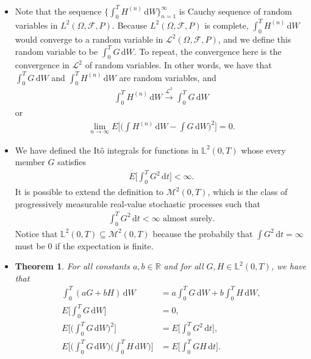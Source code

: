 \documentclass[10pt]{article}
\newtheorem{theorem}[lemma]{Theorem}
\newcommand{\dee}{\mathrm{d}}
\newcommand{\mcal}[1]{\mathcal{#1}}
\newcommand{\Real}{\mathbb{R}}
\begin{document}
\begin{itemize}
  \item Note that the sequence $\Big\{ \int_0^T H^{(n)}\, \dee W \Big\}_{n=1}^\infty$ is Cauchy sequence of random variables in $L^2(\Omega, \mcal{F}, P)$. Because $L^2(\Omega, \mcal{F}, P)$ is complete, $\int_0^T H^{(n)}\, \dee W$  would converge to a random variable in $\mcal{L}^2(\Omega, \mcal{F}, P)$, and we define this random variable to be $\int_0^T G\, \dee W$. To repeat, the convergence here is the convergence in $\mcal{L}^2$ of random variables. In other words, we have that $\int_0^T G\, \dee W$ and $\int_0^T H^{(n)}\, \dee W$ are random variables, and
  \begin{align*}
    \int_0^T H^{(n)}\, \dee W \xrightarrow[]{\mcal{L}^2} \int_0^T G\, \dee W
  \end{align*}
  or
  \begin{align*}
    \lim_{n \rightarrow \infty} E\bigg[ \bigg( \int H^{(n)}\, \dee W - \int G\, \dee W \bigg)^2 \bigg] = 0.
  \end{align*}  
  
  \item We have defined the It\^{o} integrals for functions in $\mathbb{L}^2(0,T)$ whose every member $G$ satisfies
  \begin{align*}
    E \bigg[\int_0^T G^2\, \dee t\bigg] < \infty.
  \end{align*}
  It is possible to extend the definition to $\mcal{M}^2(0,T)$, which is the class of progressively measurable real-value stochastic processes such that
  \begin{align*}
    \int_0^T G^2\, \dee t < \infty \mbox{ almost surely.}
  \end{align*}
  Notice that $\mathbb{L}^2(0,T) \subseteq \mcal{M}^2(0,T)$ because the probabily that $\int G^2\, \dee t = \infty$ must be $0$ if the expectation is finite.

  \item \begin{theorem} \label{theorem:ito-integral-properties}
    For all constants $a, b \in \Real$ and for all $G, H \in \mathbb{L}^2(0,T)$, we have that
    \begin{align*}
      \int_0^T (aG + bH)\, \dee W &= a \int_0^T G\, \dee W + b \int_0^T H\, \dee W, \\
      E\bigg[ \int_0^T G\, \dee W \bigg] &= 0, \\
      E\bigg[ \bigg( \int_0^T G\, \dee W \bigg)^2 \bigg] &= E \bigg[ \int_0^T G^2\, \dee t \bigg], \\
      E\bigg[ \bigg( \int_0^T G\, \dee W \bigg) \bigg( \int_0^T H\, \dee W \bigg) \bigg] &= E \bigg[ \int_0^T GH \, \dee t \bigg]. 
    \end{align*}
  \end{theorem}
\end{itemize}
\end{document}
